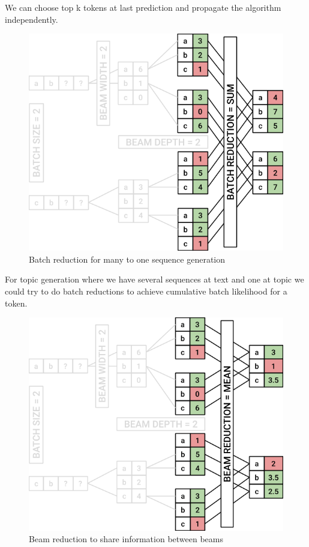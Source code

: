 \documentclass{article}
\begin{document}
We can choose top k tokens at last prediction and propagate the algorithm independently.

\begin{figure}[H]
    \centering
    \includegraphics[width=1.0\linewidth]{beam_batch_red.png}
    \caption{Batch reduction for many to one sequence generation}
    \label{fig:beam}
\end{figure}
For topic generation where we have several sequences at text and one at topic we could try to do batch reductions to achieve cumulative batch likelihood for a token.

\begin{figure}[H]
    \centering
    \includegraphics[width=1.0\linewidth]{beam_beam_red.png}
    \caption{Beam reduction to share information between beams}
    \label{fig:beam}
\end{figure}
\end{document}
